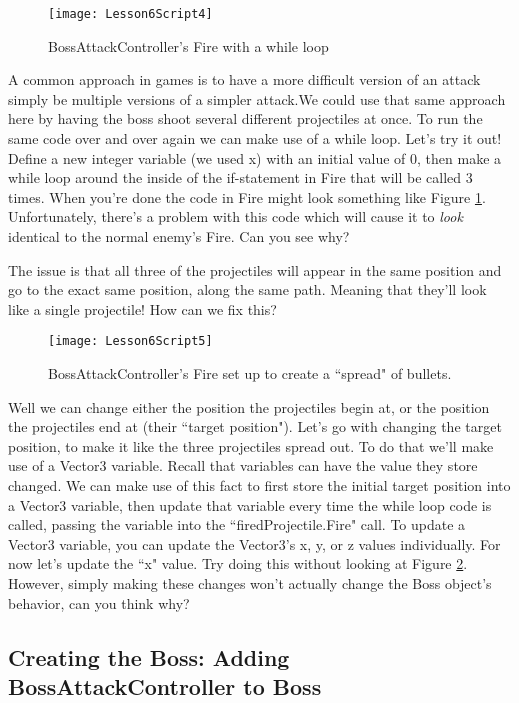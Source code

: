 \documentclass{article}
\begin{document}
\begin{figure}
  \texttt{[image: Lesson6Script4]}
  \caption{BossAttackController's Fire with a while loop}
  \label{fig:Lesson6Script4}
\end{figure}

A common approach in games is to have a more difficult version of an attack simply be multiple versions of a simpler attack.We could use that same approach here by having the boss shoot several different projectiles at once. To run the same code over and over again we can make use of a while loop. Let's try it out! Define a new integer variable (we used x) with an initial value of 0, then make a while loop around the inside of the if-statement in Fire that will be called 3 times. When you're done the code in Fire might look something like Figure \ref{fig:Lesson6Script4}. Unfortunately, there's a problem with this code which will cause it to \textit{look} identical to the normal enemy's Fire. Can you see why?

The issue is that all three of the projectiles will appear in the same position and go to the exact same position, along the same path. Meaning that they'll look like a single projectile! How can we fix this?

\begin{figure}
  \texttt{[image: Lesson6Script5]}
  \caption{BossAttackController's Fire set up to create a ``spread" of bullets.}
  \label{fig:Lesson6Script5}
\end{figure}

Well we can change either the position the projectiles begin at, or the position the projectiles end at (their ``target position"). Let's go with changing the target position, to make it like the three projectiles spread out. To do that we'll make use of a Vector3 variable. Recall that variables can have the value they store changed. We can make use of this fact to first store the initial target position into a Vector3 variable, then update that variable every time the while loop code is called, passing the variable into the ``firedProjectile.Fire" call. To update a Vector3 variable, you can update the Vector3's x, y, or z values individually. For now let's update the ``x" value. Try doing this without looking at Figure \ref{fig:Lesson6Script5}. However, simply making these changes won't actually change the Boss object's behavior, can you think why?

\subsection{Creating the Boss: Adding BossAttackController to Boss}
\end{document}
